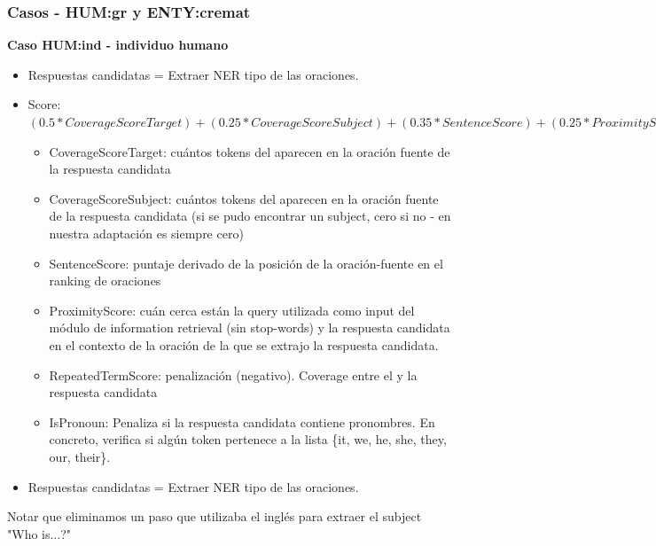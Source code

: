 \begin{frame}
\frametitle{Casos - HUM:gr y ENTY:cremat}
\textbf{Caso HUM:ind - individuo humano}
\ChangeItemFont{\footnotesize}{\footnotesize}{\footnotesize}
\begin{itemize}
  \item Respuestas candidatas = Extraer NER tipo  de las oraciones.
  \item Score: $(0.5 * CoverageScoreTarget)+ (0.25 * CoverageScoreSubject) + (0.35 * SentenceScore) +
             (0.25 * ProximityScore)  + (0.1 * RepeatedTermScore) + (0.5 * IsPronoun)$
  \begin{itemize}
    \item CoverageScoreTarget: cuántos tokens del  aparecen en la oración fuente de la respuesta candidata
    \item CoverageScoreSubject: cuántos tokens del  aparecen en la oración fuente de la respuesta candidata (si se pudo encontrar un subject, cero si no - en nuestra adaptación es siempre cero)
    \item SentenceScore: puntaje derivado de la posición de la oración-fuente en el ranking de oraciones
    \item ProximityScore: cuán cerca están la query utilizada como input del módulo de information retrieval (sin stop-words) y la respuesta candidata en el contexto de la oración de la que se extrajo la respuesta candidata.
    \item RepeatedTermScore: penalización (negativo). Coverage entre el  y la respuesta candidata
    \item IsPronoun: Penaliza si la respuesta candidata contiene pronombres. En concreto, verifica si algún token pertenece a la lista \{it, we, he, she, they, our, their\}.
  \end{itemize}
  \item Respuestas candidatas = Extraer NER tipo  de las oraciones.
\end{itemize}
{\footnotesize Notar que eliminamos un paso que utilizaba el inglés para extraer el subject "Who is...?"

}

\end{frame}

